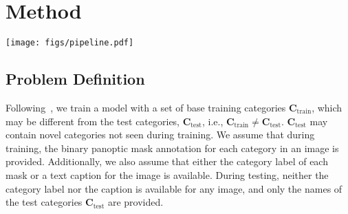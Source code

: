 \documentclass[10pt,twocolumn,letterpaper]{article}
\newcommand{\ourmethod}{ODISE}
\begin{document}
\section{Method}

\begin{figure*}[t]
    \centering
    \texttt{[image: figs/pipeline.pdf]}
    \vspace{-1.5em}
    \caption{
        \textbf{\ourmethod{} Overview and Training Pipeline}. 
        We first encode the input image into an implicit text embedding with an implicit captioner (image encoder $\mathcal{V}$ and MLP). 
        With the image and its implicit text embedding as input, we extract their diffusion features from a frozen text-to-image diffusion UNet (Sec~\ref{sec:diffusion}). 
        With the UNet's features, a mask generator predicts class-agnostic binary masks and their associated mask embedding features (Sec~\ref{sec:mask-generator}).
        We perform a dot product between the mask embedding features and the text embeddings of training category names (\textcolor[HTML]{EC603D}{red box}) or the nouns of the image's caption (\textcolor[HTML]{008F00}{green box}) to categorize them.
        The similarity matrix for mask classification is supervised by either a cross entropy loss with ground truth category labels (\textcolor[HTML]{EC603D}{red solid path}), or via a grounding loss with the paired image captions (\textcolor[HTML]{008F00}{green dash path}) (Sec~\ref{sec:discriminative}).
    }
    \vspace{-1.5em}
    \label{fig:pipeline}
\end{figure*}
\vspace{-0.25em}
\subsection{Problem Definition}
\vspace{-0.25em}
\label{sec:preliminaries}
Following~\cite{kirillov2019panoptic, ding2022open}, we train a model with a set of base training categories $\mathbf{C}_{\text{train}}$, which may be different from the test categories, $\mathbf{C}_{\text{test}}$, i.e., $\mathbf{C}_{\text{train}} \neq \mathbf{C}_{\text{test}}$. $\mathbf{C}_{\text{test}}$ may contain novel categories not seen during training. We assume that during training, the binary panoptic mask annotation for each category in an image is provided. Additionally, we also assume that either the category label of each mask or a text caption for the image is available. During testing, neither the category label nor the caption is available for any image, and only the names of the test categories $\mathbf{C}_{\text{test}}$ are provided.
\end{document}
